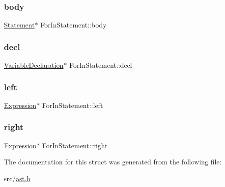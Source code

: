 \subsubsection{\texorpdfstring{body}{body}}
{\footnotesize\ttfamily \hyperlink{struct_statement}{Statement}$\ast$ For\+In\+Statement\+::body}

\mbox{\label{struct_for_in_statement_a145dd51f7e729b6f065edc16d913662f}} 
\subsubsection{\texorpdfstring{decl}{decl}}
{\footnotesize\ttfamily \hyperlink{struct_variable_declaration}{Variable\+Declaration}$\ast$ For\+In\+Statement\+::decl}

\mbox{\label{struct_for_in_statement_acb865c777a9c3ccbe84ed09532f1a22f}} 
\subsubsection{\texorpdfstring{left}{left}}
{\footnotesize\ttfamily \hyperlink{struct_expression}{Expression}$\ast$ For\+In\+Statement\+::left}

\mbox{\label{struct_for_in_statement_a8aec27cbc19e2cb038acd3d0fc0a1969}} 
\subsubsection{\texorpdfstring{right}{right}}
{\footnotesize\ttfamily \hyperlink{struct_expression}{Expression}$\ast$ For\+In\+Statement\+::right}



The documentation for this struct was generated from the following file\+:\begin{DoxyCompactItemize}
\item 
src/\hyperlink{ast_8h}{ast.\+h}\end{DoxyCompactItemize}
